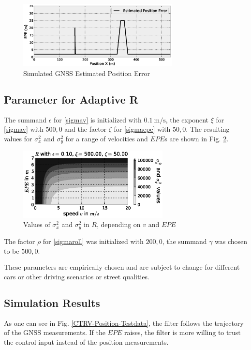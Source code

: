 \documentclass[conference]{IEEEtran}
\begin{document}
\begin{figure}[ht]
\centering
\includegraphics[width=3.2in]{images/Testdata-EPE}
\caption{Simulated GNSS Estimated Position Error}
\label{Testdata-EPE}
\end{figure}

\subsection{Parameter for Adaptive R}

The summand $\epsilon$ for \eqref{sigmav} is initialized with $\SI{0.1}{\metre\per\second}$, the exponent $\xi$ for \eqref{sigmav} with $500{,}0$ and the factor $\zeta$ for \eqref{sigmaepe} with $50{,}0$. The resulting values for $\sigma_x^2$ and $\sigma_y^2$ for a range of velocities and $EPE$s are shown in Fig. \ref{R1}.

\begin{figure}[ht]
\centering
\includegraphics[width=3.0in]{images/R}
\caption{Values of $\sigma_x^2$ and $\sigma_y^2$ in $R$, depending on $v$ and $EPE$}
\label{R1}
\end{figure}

The factor $\rho$ for \eqref{sigmaroll} was initialized with $200{,}0$, the summand $\gamma$ was chosen to be $500{,}0$.

These parameters are empirically chosen and are subject to change for different cars or other driving scenarios or street qualities.

\subsection{Simulation Results}

As one can see in Fig. \ref{CTRV-Position-Testdata}, the filter follows the trajectory of the GNSS measurements. If the $EPE$ raises, the filter is more willing to trust the control input instead of the position measurements.
\end{document}
